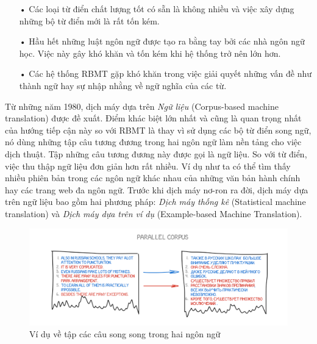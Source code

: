 \begin{itemize}
	\item[•] Các loại từ điển chất lượng tốt có sẵn là không nhiều và việc xây dựng những bộ từ điển mới là rất tốn kém.
	\item[•] Hầu hết những luật ngôn ngữ được tạo ra bằng tay bởi các nhà ngôn ngữ học. Việc này gây khó khăn và tốn kém khi hệ thống trở nên lớn hơn.
	\item[•] Các hệ thống RBMT gặp khó khăn trong việc giải quyết những vấn đề như thành ngữ hay sự nhập nhằng về ngữ nghĩa của các từ. 
\end{itemize}
Từ những năm 1980, dịch máy dựa trên \textit{Ngữ liệu} (Corpus-based machine translation) được đề xuất. Điểm khác biệt lớn nhất và cũng là quan trọng nhất của hướng tiếp cận này so với RBMT là thay vì sử dụng các bộ từ điển song ngữ, nó dùng những tập câu tương đương trong hai ngôn ngữ làm nền tảng cho việc dịch thuật. Tập những câu tương đương này được gọi là ngữ liệu. So với từ điển, việc thu thập ngữ liệu đơn giản hơn rất nhiều. Ví dụ như ta có thể tìm thấy nhiều phiên bản trong các ngôn ngữ khác nhau của những văn bản hành chính hay các trang web đa ngôn ngữ. Trước khi dịch máy nơ-ron ra đời, dịch máy dựa trên ngữ liệu bao gồm hai phương pháp: \textit{Dịch máy thống kê} (Statistical machine translation) và \textit{Dịch máy dựa trên ví dụ} (Example-based Machine Translation).


\begin{figure}
	\centering
	\includegraphics[width=\textwidth]{smt}
	\caption[Ví dụ về tập các câu song song trong hai ngôn ngữ]{Ví dụ về tập các câu song song trong hai ngôn ngữ}
	\label{fig_parallelcorpus}
\end{figure}


